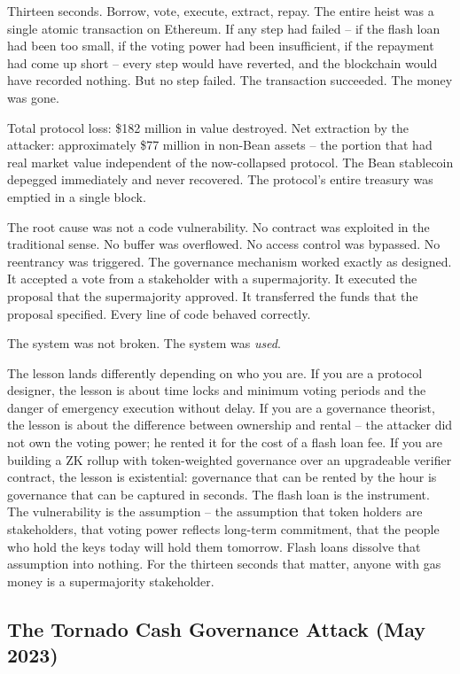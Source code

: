\documentclass[
  11pt,
  openany]{report}
\begin{document}
Thirteen seconds. Borrow, vote, execute, extract, repay. The entire heist was a
single atomic transaction on Ethereum. If any step had failed -- if the flash
loan had been too small, if the voting power had been insufficient, if the
repayment had come up short -- every step would have reverted, and the
blockchain would have recorded nothing. But no step failed. The transaction
succeeded. The money was gone.

Total protocol loss: \$182 million in value destroyed. Net extraction by the
attacker: approximately \$77 million in non-Bean assets -- the portion that had
real market value independent of the now-collapsed protocol. The Bean stablecoin
depegged immediately and never recovered. The protocol's entire treasury was
emptied in a single block.

The root cause was not a code vulnerability. No contract was exploited in the
traditional sense. No buffer was overflowed. No access control was bypassed. No
reentrancy was triggered. The governance mechanism worked exactly as designed.
It accepted a vote from a stakeholder with a supermajority. It executed the
proposal that the supermajority approved. It transferred the funds that the
proposal specified. Every line of code behaved correctly.

The system was not broken. The system was \emph{used}.

The lesson lands differently depending on who you are. If you are a protocol
designer, the lesson is about time locks and minimum voting periods and the
danger of emergency execution without delay. If you are a governance theorist,
the lesson is about the difference between ownership and rental -- the attacker
did not own the voting power; he rented it for the cost of a flash loan fee. If
you are building a ZK rollup with token-weighted governance over an upgradeable
verifier contract, the lesson is existential: governance that can be rented by
the hour is governance that can be captured in seconds. The flash loan is the
instrument. The vulnerability is the assumption -- the assumption that token
holders are stakeholders, that voting power reflects long-term commitment, that
the people who hold the keys today will hold them tomorrow. Flash loans dissolve
that assumption into nothing. For the thirteen seconds that matter, anyone with
gas money is a supermajority stakeholder.

\subsection{The Tornado Cash Governance Attack (May
2023)}\label{the-tornado-cash-governance-attack-may-2023}
\end{document}

